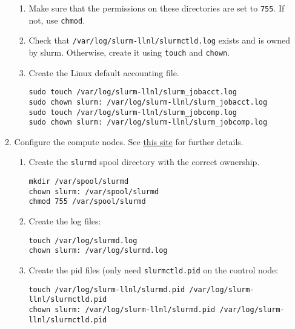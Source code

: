 \begin{enumerate}
\begin{enumerate}
\begin{enumerate}
		\item Make sure that the permissions on these directories are set to \texttt{755}. If not, use \texttt{chmod}.

		\item Check that \texttt{/var/log/slurm-llnl/slurmctld.log} exists and is owned by slurm. Otherwise, create it using \texttt{touch} and \texttt{chown}.

		\item Create the Linux default accounting file.

			\texttt{sudo touch /var/log/slurm-llnl/slurm\_jobacct.log} \\
			\texttt{sudo chown slurm: /var/log/slurm-llnl/slurm\_jobacct.log } \\
			\texttt{sudo touch /var/log/slurm-llnl/slurm\_jobcomp.log} \\
			\texttt{sudo chown slurm: /var/log/slurm-llnl/slurm\_jobcomp.log}

		\end{enumerate}

	\item Configure the compute nodes. See \href{https://wiki.fysik.dtu.dk/niflheim/Slurm_configuration#id12}{this site} for further details. 

		\begin{enumerate}
		\item Create the \texttt{slurmd} spool directory with the correct ownership.

			\texttt{mkdir /var/spool/slurmd} \\%
			\texttt{chown slurm: /var/spool/slurmd} \\%
			\texttt{chmod 755 /var/spool/slurmd}%

		\item Create the log files:

			\texttt{touch /var/log/slurmd.log} \\
			\texttt{chown slurm: /var/log/slurmd.log}
	
		\item Create the pid files (only need \texttt{slurmctld.pid} on the control node:

			\texttt{touch /var/log/slurm-llnl/slurmd.pid /var/log/slurm-llnl/slurmctld.pid} \\
			\texttt{chown slurm: /var/log/slurm-llnl/slurmd.pid /var/log/slurm-llnl/slurmctld.pid}


\end{enumerate}
\end{enumerate}
\end{enumerate}
